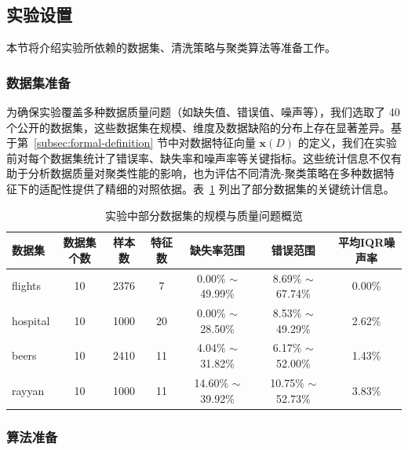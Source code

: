 \documentclass[10pt]{article} %
\numberwithin{equation}{section}
\begin{document}
\subsection{实验设置}
\label{sec:exp_setting}

本节将介绍实验所依赖的数据集、清洗策略与聚类算法等准备工作。

\subsubsection{数据集准备}
\label{sec:dataset_prep}

为确保实验覆盖多种数据质量问题（如缺失值、错误值、噪声等），我们选取了 40 个公开的数据集，这些数据集在规模、维度及数据缺陷的分布上存在显著差异。基于第~\ref{subsec:formal-definition} 节中对数据特征向量 $\mathbf{x}(D)$ 的定义，我们在实验前对每个数据集统计了错误率、缺失率和噪声率等关键指标。这些统计信息不仅有助于分析数据质量对聚类性能的影响，也为评估不同清洗-聚类策略在多种数据特征下的适配性提供了精细的对照依据。表~\ref{tab:datasets_info} 列出了部分数据集的关键统计信息。

\begin{table}[htbp]
    \centering
    \small %
    \begin{tabular}{lcccccc}
    \toprule
    \textbf{数据集} & \textbf{数据集个数} & \textbf{样本数} & \textbf{特征数} & \textbf{缺失率范围} & \textbf{错误范围} & \textbf{平均IQR噪声率} \\
    \midrule
    flights  & 10  & 2376   & 7  & 0.00\% $\sim$ 49.99\% & 8.69\% $\sim$ 67.74\%  & 0.00\%  \\
    hospital & 10  & 1000   & 20 & 0.00\% $\sim$ 28.50\% & 8.53\% $\sim$ 49.29\%  & 2.62\%  \\
    beers    & 10  & 2410   & 11 & 4.04\% $\sim$ 31.82\% & 6.17\% $\sim$ 52.00\%  & 1.43\%  \\
    rayyan   & 10  & 1000   & 11 & 14.60\% $\sim$ 39.92\% & 10.75\% $\sim$ 52.73\% & 3.83\%  \\
    \bottomrule
    \end{tabular}
    \caption{实验中部分数据集的规模与质量问题概览}
    \label{tab:datasets_info}
\end{table}

\noindent
\vspace{-20pt} %

\subsubsection{算法准备}
\label{sec:algo_prep}
\end{document}
